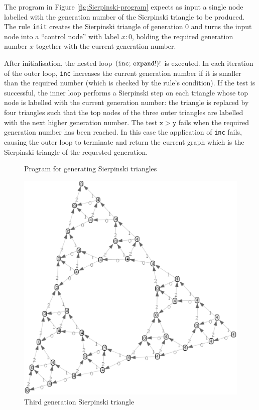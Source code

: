 The program in Figure \ref{fig:Sierpinski-program} expects as input a single node labelled with the generation number of the Sierpinski triangle to be produced. The rule \texttt{init} creates the Sierpinski triangle of generation 0 and turns the input node into a ``control node'' with label $x{:}0$, holding the required generation number $x$ together with the current generation number.

After initialisation, the nested loop $\mathtt{(inc;\, expand!)!}$ is executed. In each iteration of the outer loop, \texttt{inc} increases the current generation number if it is smaller than the required number (which is checked by the rule's condition). If the test is successful, the inner loop  performs a Sierpinski step on each triangle whose top node is labelled with the current generation number: the triangle is replaced by four triangles such that the top nodes of the three outer triangles are labelled with the next higher generation number. The test $\mathtt{x > y}$ fails when the required generation number has been reached. In this case the application of \texttt{inc} fails, causing the outer loop to terminate and return the current graph which is the Sierpinski triangle of the requested generation.

\begin{figure}[p]
\begin{center}

\end{center}
\caption{Program for generating Sierpinski triangles}\label{fig:Sierpinski-program}
 \begin{center}
  \includegraphics[scale=.35,angle=-15]{sierpinski-3.eps}
 \end{center}
\vspace*{-2.5cm}
\caption{Third generation Sierpinski triangle \label{fig:sierpinski}}
\end{figure}


